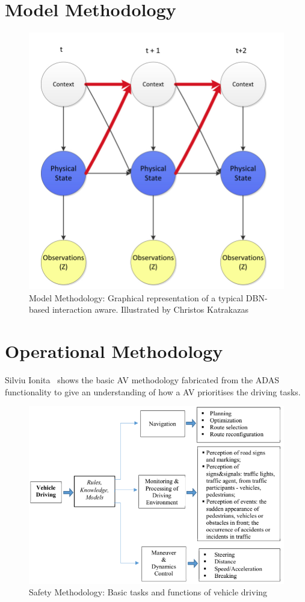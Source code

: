 \documentclass[12pt]{report} %
\begin{document}
	\section{Model Methodology}
		\begin{figure}[ht]
			\centering
			\includegraphics[width=.60\columnwidth]{Figures/literature_review/Research/DBN_Model.png}
			\caption{Model Methodology: Graphical representation of a typical DBN-based interaction aware. Illustrated by Christos Katrakazas~\cite{katrakazas_new_2019}}
			\label{fig:avmModelMethodology}
		\end{figure}

	\section{Operational Methodology}
		Silviu Ionita~\cite{ionita_autonomous_2017} shows the basic AV methodology fabricated from the ADAS functionality to give an understanding of how a AV prioritises the driving tasks. 	
		
		\begin{figure}[ht]
			\centering
			\includegraphics[width=.60\columnwidth]{Figures/literature_review/proposal/SystemFunctionality-1.png}
			\caption{Safety Methodology: Basic tasks and functions of vehicle driving~\cite{ionita_autonomous_2017}}
			\label{fig:avmOperationalMethodology-SF1}
		\end{figure}
\end{document}
